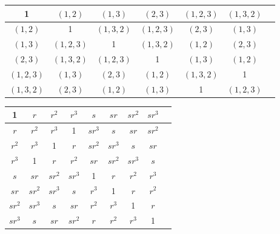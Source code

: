 \documentclass{article}
\begin{document}
\begin{center}
    \begin{tabular}{ |c|c|c|c|c|c|c| } 
        \hline
        1 & $(1,2)$ & $(1,3)$ & $(2,3)$ & $(1,2,3)$ & $(1,3,2)$ \\
        \hline
        $(1,2)$ & 1 & $(1,3,2)$ & $(1,2,3)$ & $(2,3)$ & $(1,3)$ \\
        \hline
        $(1,3)$ & $(1,2,3)$ & 1 & $(1,3,2)$ & $(1,2)$ & $(2,3)$ \\
        \hline
        $(2,3)$ & $(1,3,2)$ & $(1,2,3)$ & 1 & $(1,3)$ & $(1,2)$ \\
        \hline
        $(1,2,3)$ & $(1,3)$ & $(2,3)$ & $(1,2)$ & $(1,3,2)$ & 1 \\
        \hline
        $(1,3,2)$ & $(2,3)$ & $(1,2)$ & $(1,3)$ & 1 & $(1,2,3)$ \\
        \hline
    \end{tabular}

    \vspace{1em}

    \begin{tabular}{ |c|c|c|c|c|c|c|c|c| } 
        \hline
        1 & $r$ & $r^2$ & $r^3$ & $s$ & $sr$ & $sr^2$ & $sr^3$ \\
        \hline
        $r$ & $r^2$ & $r^3$ & 1 & $sr^3$ & $s$ & $sr$ & $sr^2$ \\
        \hline
        $r^2$ & $r^3$ & 1 & $r$ & $sr^2$ & $sr^3$ & $s$ & $sr$ \\
        \hline
        $r^3$ & 1 & $r$ & $r^2$ & $sr$ & $sr^2$ & $sr^3$ & $s$ \\
        \hline
        $s$ & $sr$ & $sr^2$ & $sr^3$ & 1 & $r$ & $r^2$ & $r^3$ \\
        \hline
        $sr$ & $sr^2$ & $sr^3$ & $s$ & $r^3$ & 1 & $r$ & $r^2$ \\
        \hline
        $sr^2$ & $sr^3$ & $s$ & $sr$ & $r^2$ & $r^3$ & 1 & $r$ \\
        \hline
        $sr^3$ & $s$ & $sr$ & $sr^2$ & $r$ & $r^2$ & $r^3$ & 1 \\
        \hline
    \end{tabular}    \vspace{1em}


\end{center}
\end{document}
